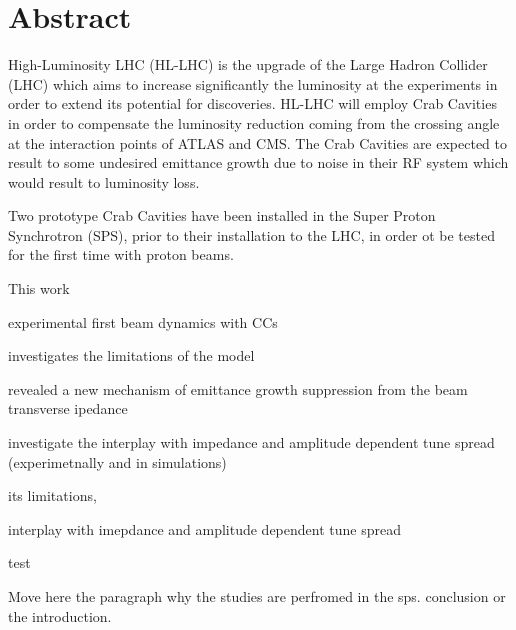 \cleardoublepage
\chapter*{Abstract}

High-Luminosity LHC (HL-LHC) is the upgrade of the Large Hadron Collider (LHC) which aims to increase significantly the luminosity at the experiments in order to extend its potential for discoveries. HL-LHC will employ Crab Cavities in order to compensate the luminosity reduction coming from the crossing angle at the interaction points of ATLAS and CMS. The Crab Cavities are expected to result to some undesired emittance growth due to noise in their RF system which would result to luminosity loss. 

Two prototype Crab Cavities have been installed in the Super Proton Synchrotron (SPS), prior to their installation to the LHC, in order ot be tested for the first time with proton beams.  


This work

experimental first beam dynamics with CCs

investigates the limitations of the model

revealed a new mechanism of emittance growth suppression from the beam transverse ipedance


investigate the interplay with impedance and amplitude dependent tune spread (experimetnally and in simulations)


its limitations, 

interplay with imepdance and amplitude dependent tune spread

test

Move here the paragraph why the studies are perfromed in the sps. conclusion or the introduction.

